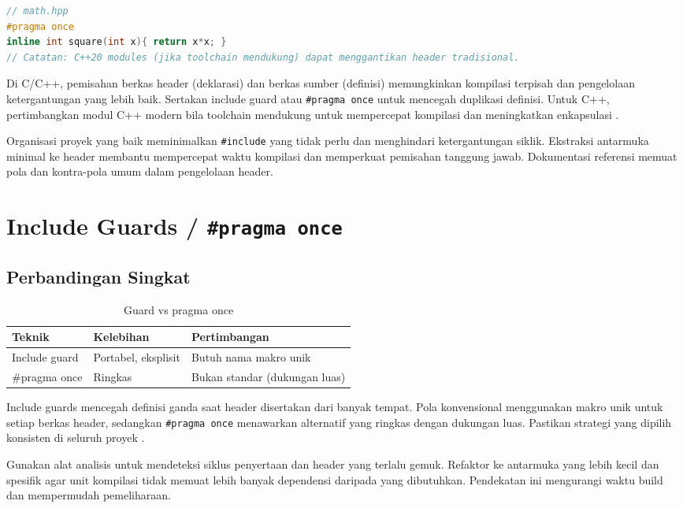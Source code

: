 \documentclass[../main.tex]{subfiles}
\begin{document}
\begin{lstlisting}[language=C++, caption={Header C++ dan catatan module C++20}]
// math.hpp
#pragma once
inline int square(int x){ return x*x; }
// Catatan: C++20 modules (jika toolchain mendukung) dapat menggantikan header tradisional.
\end{lstlisting}
Di C/C++, pemisahan berkas header (deklarasi) dan berkas sumber (definisi) memungkinkan kompilasi terpisah dan pengelolaan ketergantungan yang lebih baik. Sertakan include guard atau \texttt{\#pragma once} untuk mencegah duplikasi definisi. Untuk C++, pertimbangkan modul C++ modern bila toolchain mendukung untuk mempercepat kompilasi dan meningkatkan enkapsulasi \parencite{gnu-c-manual,cpp-reference}.

Organisasi proyek yang baik meminimalkan \texttt{\#include} yang tidak perlu dan menghindari ketergantungan siklik. Ekstraksi antarmuka minimal ke header membantu mempercepat waktu kompilasi dan memperkuat pemisahan tanggung jawab. Dokumentasi referensi memuat pola dan kontra-pola umum dalam pengelolaan header.

\section{Include Guards / \texttt{\#pragma once}}
\subsection{Perbandingan Singkat}
\begin{table}[h]
  \centering
  \caption{Guard vs pragma once}
  \begin{tabular}{@{}lll@{}}
    \toprule
    Teknik & Kelebihan & Pertimbangan \\
    \midrule
    Include guard & Portabel, eksplisit & Butuh nama makro unik \\
    #pragma once & Ringkas & Bukan standar (dukungan luas) \\
    \bottomrule
  \end{tabular}
\end{table}
Include guards mencegah definisi ganda saat header disertakan dari banyak tempat. Pola konvensional menggunakan makro unik untuk setiap berkas header, sedangkan \texttt{\#pragma once} menawarkan alternatif yang ringkas dengan dukungan luas. Pastikan strategi yang dipilih konsisten di seluruh proyek \parencite{gnu-c-manual,cpp-reference}.

Gunakan alat analisis untuk mendeteksi siklus penyertaan dan header yang terlalu gemuk. Refaktor ke antarmuka yang lebih kecil dan spesifik agar unit kompilasi tidak memuat lebih banyak dependensi daripada yang dibutuhkan. Pendekatan ini mengurangi waktu build dan mempermudah pemeliharaan.
\end{document}
